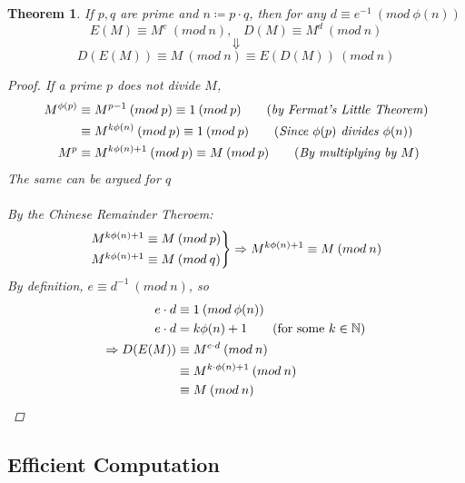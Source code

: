 \documentclass{article}
\newtheorem{theorem}{Theorem}
\begin{document}
\begin{theorem}
    If $p, q$ are prime and $n \coloneqq p \cdot q$, then for any $d \equiv e^{-1} \: (mod \: \phi(n))$
    \[ E(M) \equiv M^e \: (mod \: n),\;\;\; D(M) \equiv M^d \: (mod \: n)
    \]
    \[ \Downarrow \]
    \[  D(E(M)) \equiv M \: (mod \: n) \equiv E(D(M)) \: (mod \: n)
    \]
    \begin{proof}
        If a prime $p$ does not divide $M$,
        \begin{align*}
            M^ {\phi(p)} & \equiv M^ {p-1} \: (mod \: p) \equiv 1 \: (mod \: p) \tag{\emph{by Fermat's Little Theorem}}             \\
                         & \equiv M^{k \phi(n)} \: (mod \: p) \equiv 1 \: (mod \: p) \tag{\emph{Since $\phi(p)$ divides $\phi(n)$}} \\
            M^{p}        & \equiv M ^{k \phi(n) + 1}\: (mod \: p) \equiv M \: (mod \: p) \tag{\emph{By multiplying by $M$}}
        \end{align*}
        The same can be argued for $q$ \\\\
        By the Chinese Remainder Theroem: \\
        \[
            \begin{rcases*}
                M^{k \phi(n) + 1} \equiv M \: (mod \: p) \\
                M^{k \phi(n) + 1} \equiv M \: (mod \: q)
            \end{rcases*}
            \Rightarrow
            M^{k \phi (n) + 1} \equiv M \: (mod \: n)
        \]
        By definition, $e \equiv d ^{-1} \: (mod \: n)$, so
        \begin{align*}
            e \cdot d           & \equiv 1 \: (mod \: \phi(n))                      \\
            e \cdot d           & = k \phi(n) + 1 \tag{for some $k \in \mathbb{N}$} \\
            \Rightarrow D(E(M)) & \equiv M ^ {e \cdot d} \: (mod \: n)              \\
                                & \equiv M^{k \cdot \phi(n) + 1} \: (mod \: n)      \\
                                & \equiv M \: (mod \: n)
        \end{align*}
    \end{proof}
\end{theorem}
\newpage
\subsection{Efficient Computation}
\end{document}
